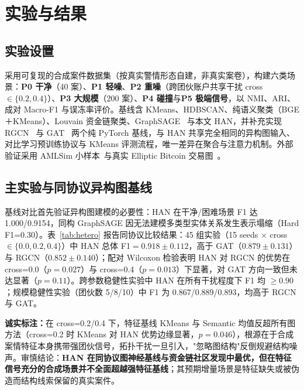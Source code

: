 \documentclass[12pt,a4paper,fontset=windows]{ctexart}
\begin{document}
\section{实验与结果}

\subsection{实验设置}

采用可复现的合成案件数据集（按真实警情形态自建，非真实案卷），构建六类场景：\textbf{P0 干净}（40 案）、\textbf{P1 轻噪}、\textbf{P2 重噪}（跨团伙账户共享干扰 cross $\in \{0.2, 0.4\}$）、\textbf{P3 大规模}（200 案）、\textbf{P4 碰撞}与\textbf{P5 极端信号}，以 NMI、ARI、成对 Macro-F1 与误冻率评价。基线含 KMeans、HDBSCAN、纯语义聚类（BGE＋KMeans）、Louvain 资金链聚类、GraphSAGE~\cite{hamilton2017graphsage} 与本文 HAN，并补充实现 RGCN~\cite{schlichtkrull2018rgcn} 与 GAT~\cite{velickovic2018gat} 两个纯 PyTorch 基线，与 HAN 共享完全相同的异构图输入、对比学习预训练协议与 KMeans 评测流程，唯一差异在聚合与注意力机制。外部验证采用 AMLSim 小样本~\cite{weber2018amlfirstlook}与真实 Elliptic Bitcoin 交易图~\cite{weber2019elliptic}。

\subsection{主实验与同协议异构图基线}

基线对比首先验证异构图建模的必要性：HAN 在干净/困难场景 F1 达 1.000/0.9154，同构 GraphSAGE 因无法建模多类型实体关系发生表示塌缩（Hard F1=0.30）。表~\ref{tab:hetero} 报告同协议比较结果：45 组实验（15 seeds $\times$ cross $\in \{0.0, 0.2, 0.4\}$）中 HAN 总体 F1$=0.918\pm0.112$，高于 GAT（$0.879\pm0.131$）与 RGCN（$0.852\pm0.140$）；配对 Wilcoxon 检验表明 HAN 对 RGCN 的优势在 cross=0.0（$p=0.027$）与 cross=0.4（$p=0.013$）下显著，对 GAT 方向一致但未达显著（$p=0.11$）。跨参数稳健性实验中 HAN 在所有干扰程度下 F1 均 $\ge 0.90$；规模稳健性实验（团伙数 5/8/10）中 F1 为 0.867/0.889/0.893，均高于 RGCN 与 GAT。

\textbf{诚实标注：}在 cross=0.2/0.4 下，特征基线 KMeans 与 Semantic 均值反超所有图方法（cross=0.2 时 KMeans 对 HAN 优势边缘显著，$p=0.046$），根源在于合成案情特征本身携带强团伙信号，拓扑干扰一旦引入，"忽略图结构"反倒规避结构噪声。审慎结论：\textbf{HAN 在同协议图神经基线与资金链社区发现中最优，但在特征信号充分的合成场景并不全面超越强特征基线}；其预期增量场景是特征缺失或被伪造而结构线索保留的真实案件。
\end{document}

